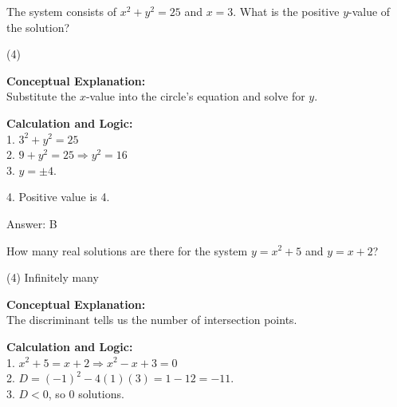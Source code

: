 \documentclass[11pt,paper=a4,answers]{exam}
\begin{document}
\begin{questions}
\question

The system consists of $x^2 + y^2 = 25$ and $x = 3$. What is the positive $y$-value of the solution?
\begin{tasks}(4)
\end{tasks}

\begin{solution}
\textbf{Conceptual Explanation:} \\
Substitute the $x$-value into the circle's equation and solve for $y$.

\vspace{20pt}

\textbf{Calculation and Logic:} \\
1. $3^2 + y^2 = 25$ \\
2. $9 + y^2 = 25 \Rightarrow y^2 = 16$ \\
3. $y = \pm 4$.

\vspace{10pt}

4. Positive value is 4.

\vspace{25pt}

Answer: \colorbox{yellow!100}{B}
\end{solution}

\vspace{40pt}

\question
How many real solutions are there for the system $y = x^2 + 5$ and $y = x + 2$?
\begin{tasks}(4)
    \task Infinitely many
\end{tasks}

\begin{solution}
\textbf{Conceptual Explanation:} \\
The discriminant tells us the number of intersection points.

\vspace{20pt}

\textbf{Calculation and Logic:} \\
1. $x^2 + 5 = x + 2 \Rightarrow x^2 - x + 3 = 0$ \\
2. $D = (-1)^2 - 4(1)(3) = 1 - 12 = -11$. \\
3. $D < 0$, so 0 solutions.

\vspace{25pt}


\end{solution}
\end{questions}
\end{document}
